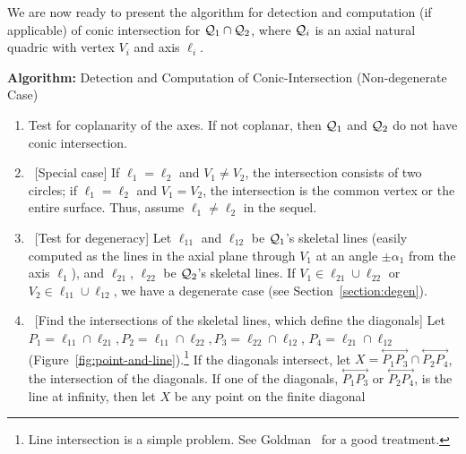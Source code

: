      We are now ready to present the algorithm for detection and computation
(if applicable) of conic intersection for
${\cal Q}_1\cap{\cal Q}_2$, where ${\cal Q}_i$ is an axial natural quadric with
vertex $V_i$ and axis $\ell_i$.

\begin{center}
\begin{minipage}{5in}
\vspace{8mm}
\begin{center}
     {\bf Algorithm: } Detection and Computation of Conic-Intersection
               (Non-degenerate Case)
\end{center}
{\small
\begin{enumerate}
     \item Test for coplanarity of the axes.
          If not coplanar, then ${\cal Q}_1$ and ${\cal Q}_2$
          do not have conic intersection.
     \item \ [Special case]
          If $\ell_1=\ell_2$ and $V_1\neq V_2$, the intersection consists
          of two circles;  if $\ell_1=\ell_2$ and $V_1=V_2$, the intersection
          is the common vertex or the entire surface.
          Thus, assume $\ell_1 \neq \ell_2$ in the sequel.
     \item \ [Test for degeneracy]
          Let $\ell_{11}$ and $\ell_{12}$ be ${\cal Q}_1$'s skeletal lines
          (easily computed as the lines in the axial plane through $V_1$
          at an angle $\pm \alpha_1$ from the axis $\ell_1$),
          and $\ell_{21}$, $\ell_{22}$ be ${\cal Q}_2$'s skeletal lines.
          If $V_1\in\ell_{21}\cup\ell_{22}$ or $V_2\in\ell_{11}\cup\ell_{12}$,
          we have a degenerate case (see Section~\ref{section:degen}).
     \item \ [Find the intersections of the skeletal lines, which define
          the diagonals]
          Let $P_1=\ell_{11}\cap\ell_{21}, P_2=\ell_{11}\cap\ell_{22},
          P_3=\ell_{22}\cap\ell_{12}$, $P_4=\ell_{21}\cap\ell_{12}$
          (Figure~\ref{fig:point-and-line}).\footnote{Line intersection
          is a simple problem.
          See Goldman~\cite{goldman:1990} for a good treatment.}
          If the diagonals intersect,
       let $X=\stackrel{\longleftrightarrow}{P_1P_3}\cap
          \stackrel{\longleftrightarrow}{P_2P_4}$, the intersection of the
          diagonals.
          If one of the diagonals, $\stackrel{\longleftrightarrow}{P_1P_3}$
          or $\stackrel{\longleftrightarrow}{P_2P_4}$, is the line at
          infinity, then let $X$ be any point on the finite diagonal

\end{enumerate}}
\end{minipage}
\end{center}
